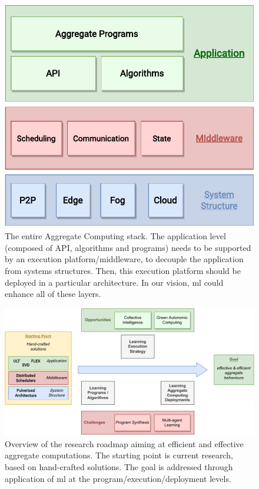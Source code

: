 \begin{figure}[h]
\centering
  \includegraphics[width=0.8\linewidth]{papers/discoli/img/ac-rl.pdf}
  \caption{The entire Aggregate Computing stack. 
  The application level (composed of API, algorithms and programs) needs to be supported by an execution platform/middleware, 
  to decouple the application from systems structures. 
  Then, this execution platform should be deployed in a particular architecture. 
  In our vision, \acl{ml} could enhance all of these layers.
  }
  \label{fig:architectures}
\end{figure}

\begin{figure}[h]
  \includegraphics[width=\linewidth]{papers/discoli/img/roadmap.pdf}
  \caption{Overview of the research roadmap aiming at efficient and effective aggregate computations. 
  The starting point is current research, based on hand-crafted solutions.
  The goal is addressed through application of \ac{ml} at the program/execution/deployment levels.}
  \label{fig:roadmap}
\end{figure}

